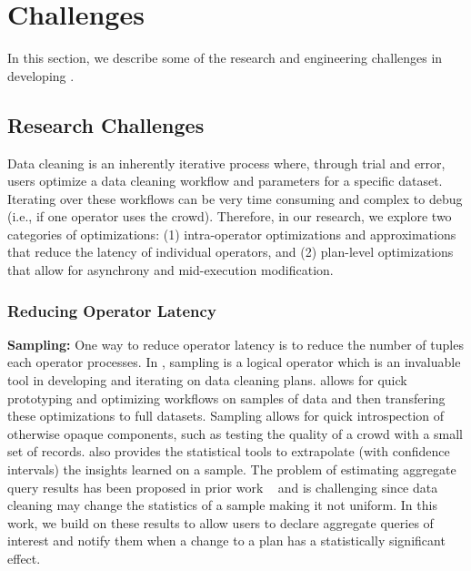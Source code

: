 \section{Challenges}
In this section, we describe some of the research and engineering challenges in developing \sys.

\subsection{Research Challenges}
Data cleaning is an inherently iterative process where, through trial and error, users optimize a data cleaning workflow and parameters for a specific dataset.
Iterating over these workflows can be very time consuming and complex to debug (i.e., if one operator uses the crowd).
Therefore, in our research, we explore two categories of optimizations: (1) intra-operator optimizations and approximations that reduce the latency of individual operators, and (2) plan-level optimizations that allow for asynchrony and mid-execution modification.

\subsubsection{Reducing Operator Latency}


\vspace{.5em}

{\noindent \bf Sampling:} One way to reduce operator latency is to reduce the number of tuples each operator processes.
In \sys, sampling is a logical operator which is an invaluable tool in developing and iterating on data cleaning plans.
\sys allows for quick prototyping and optimizing workflows on samples of data and then transfering these optimizations to full datasets.
Sampling allows for quick introspection of otherwise opaque components, such as testing the quality of a crowd with a small set of records.
\sys also provides the statistical tools to extrapolate (with confidence intervals) the insights learned on a sample.
The problem of estimating aggregate query results has been proposed in prior work ~\cite{wang1999sample} and is challenging since data cleaning may change
the statistics of a sample making it not uniform.
In this work, we build on these results to allow users to declare aggregate queries of interest and notify them when a change to a plan has a statistically significant effect.

